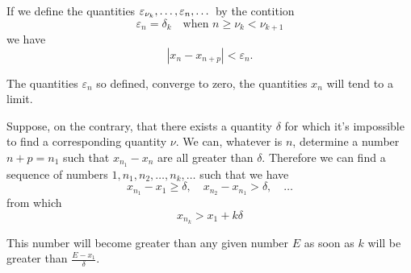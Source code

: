 \documentclass[10pt,letterpaper]{book}
\renewcommand\epsilon{\varepsilon}
\theoremstyle{definition}
\begin{document}
If we define the quantities $\jseq{\epsilon_{\nu_k}}{\epsilon_n}$ by the contition
\[
  \epsilon_n = \delta_k\quad\mbox{when }n\geq\nu_k<\nu_{k+1}
\]
we have
\[
  |x_{n}-x_{n+p}| < \epsilon_n.
\]

The quantities $\epsilon_n$ so defined, converge to zero, the quantities $x_n$ will tend to a limit.

Suppose, on the contrary, that there exists a quantity $\delta$ for which it's impossible to find a corresponding quantity $\nu$. We can, whatever is $n$, determine a number $n+p=n_1$ such that $x_{n_1}-x_n$ are all greater than $\delta$.
Therefore we can find a sequence of numbers $1, n_1, n_2,\dots,n_k,\dots$ such that we have
\[
  x_{n_1}-x_1\geq \delta,\quad x_{n_2}-x_{n_1}>\delta,\quad\dots
\]
from which
\[
  x_{n_k}>x_1+k\delta
\]

This number will become greater than any given number $E$ as soon as $k$ will be greater than $\frac{E-x_1}{\delta}$.

\begin{thebibliography}{9}

\end{thebibliography}
\end{document}
